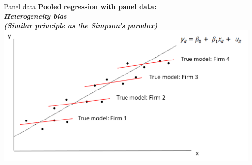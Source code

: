 \documentclass[usenames,dvipsnames]{beamer}
\begin{document}
\begin{frame}{Panel data}
\textbf{Pooled regression with panel data: \\
\textit{Heterogeneity bias\\
(Similar principle as the Simpson's paradox) }}
\includegraphics[width=\textwidth]{./img/Obrazek4}
\end{frame}
\end{document}
